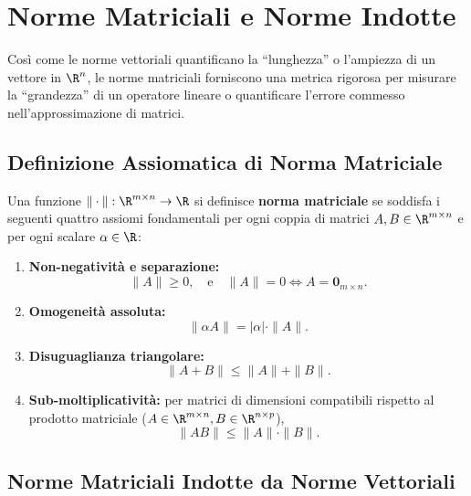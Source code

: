 \FloatBarrier
\section{Norme Matriciali e Norme Indotte}
\label{sec:norme-matriciali-indotte}

Cos\`i come le norme vettoriali quantificano la ``lunghezza'' o l'ampiezza di un vettore in $\R^n$, le norme matriciali forniscono una metrica rigorosa per misurare la ``grandezza'' di un operatore lineare o quantificare l'errore commesso nell'approssimazione di matrici.

\subsection{Definizione Assiomatica di Norma Matriciale}

\begin{definition}
Una funzione $\|\cdot\|: \R^{m \times n} \to \R$ si definisce \textbf{norma matriciale} se soddisfa i seguenti quattro assiomi fondamentali per ogni coppia di matrici $A, B \in \R^{m \times n}$ e per ogni scalare $\alpha \in \R$:
\begin{enumerate}
    \item \textbf{Non-negativit\`a e separazione:}
    \begin{equation}
        \|A\| \ge 0, \quad \text{e} \quad \|A\| = 0 \iff A = \mathbf{0}_{m \times n}.
    \end{equation}
    \item \textbf{Omogeneit\`a assoluta:}
    \begin{equation}
        \|\alpha A\| = |\alpha| \cdot \|A\|.
    \end{equation}
    \item \textbf{Disuguaglianza triangolare:}
    \begin{equation}
        \|A + B\| \le \|A\| + \|B\|.
    \end{equation}
    \item \textbf{Sub-moltiplicativit\`a:} per matrici di dimensioni compatibili rispetto al prodotto matriciale ($A \in \R^{m \times n}, B \in \R^{n \times p}$),
    \begin{equation}
        \|AB\| \le \|A\| \cdot \|B\|.
    \end{equation}
\end{enumerate}
\end{definition}

\subsection{Norme Matriciali Indotte da Norme Vettoriali}

